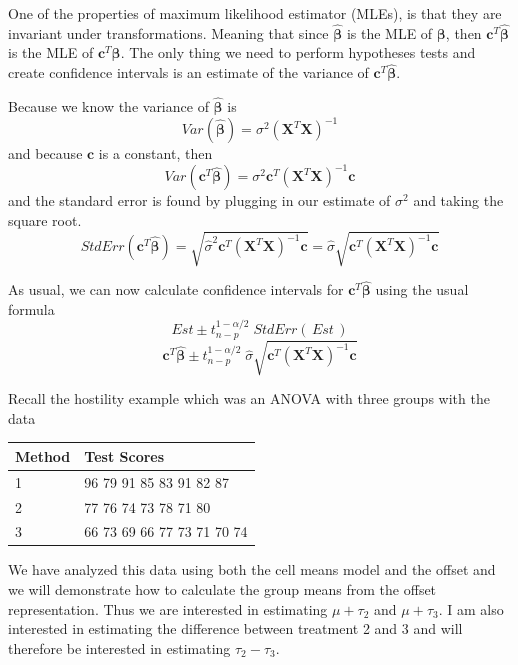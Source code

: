 \documentclass[]{book}
\theoremstyle{definition}
\theoremstyle{definition}
\theoremstyle{remark}
\begin{document}
One of the properties of maximum likelihood estimator (MLEs), is that
they are invariant under transformations. Meaning that since
\(\hat{\boldsymbol{\beta}}\) is the MLE of \(\boldsymbol{\beta}\), then
\(\boldsymbol{c}^{T}\hat{\boldsymbol{\beta}}\) is the MLE of
\(\boldsymbol{c}^{T}\boldsymbol{\beta}\). The only thing we need to
perform hypotheses tests and create confidence intervals is an estimate
of the variance of \(\boldsymbol{c}^{T}\hat{\boldsymbol{\beta}}\).

Because we know the variance of \(\hat{\boldsymbol{\beta}}\) is \[
Var\left(\hat{\boldsymbol{\beta}}\right)=\sigma^{2}\left(\boldsymbol{X}^{T}\boldsymbol{X}\right)^{-1}
\] and because \(\boldsymbol{c}\) is a constant, then \[
Var\left(\boldsymbol{c}^{T}\hat{\boldsymbol{\beta}}\right)=\sigma^{2}\boldsymbol{c}^{T}\left(\boldsymbol{X}^{T}\boldsymbol{X}\right)^{-1}\boldsymbol{c}
\] and the standard error is found by plugging in our estimate of
\(\sigma^{2}\) and taking the square root. \[
StdErr\left(\boldsymbol{c}^{T}\hat{\boldsymbol{\beta}}\right)   =   \sqrt{\hat{\sigma}^{2}\boldsymbol{c}^{T}\left(\boldsymbol{X}^{T}\boldsymbol{X}\right)^{-1}\boldsymbol{c}}
    =   \hat{\sigma}\sqrt{\boldsymbol{c}^{T}\left(\boldsymbol{X}^{T}\boldsymbol{X}\right)^{-1}\boldsymbol{c}}
\]

As usual, we can now calculate confidence intervals for
\(\boldsymbol{c}^{T}\hat{\boldsymbol{\beta}}\) using the usual formula
\[Est   \pm t_{n-p}^{1-\alpha/2}\;StdErr\left(\,Est\,\right)\] \[
\boldsymbol{c}^{T}\hat{\boldsymbol{\beta}}  \pm t_{n-p}^{1-\alpha/2}\;\hat{\sigma}\sqrt{\boldsymbol{c}^{T}\left(\boldsymbol{X}^{T}\boldsymbol{X}\right)^{-1}\boldsymbol{c}}
\]

Recall the hostility example which was an ANOVA with three groups with
the data

\begin{longtable}[]{@{}ll@{}}
\toprule
Method & Test Scores\tabularnewline
\midrule
\endhead
1 & 96 79 91 85 83 91 82 87\tabularnewline
2 & 77 76 74 73 78 71 80\tabularnewline
3 & 66 73 69 66 77 73 71 70 74\tabularnewline
\bottomrule
\end{longtable}

We have analyzed this data using both the cell means model and the
offset and we will demonstrate how to calculate the group means from the
offset representation. Thus we are interested in estimating
\(\mu+\tau_{2}\) and \(\mu+\tau_{3}\). I am also interested in
estimating the difference between treatment 2 and 3 and will therefore
be interested in estimating \(\tau_{2} - \tau_{3}\).
\end{document}

